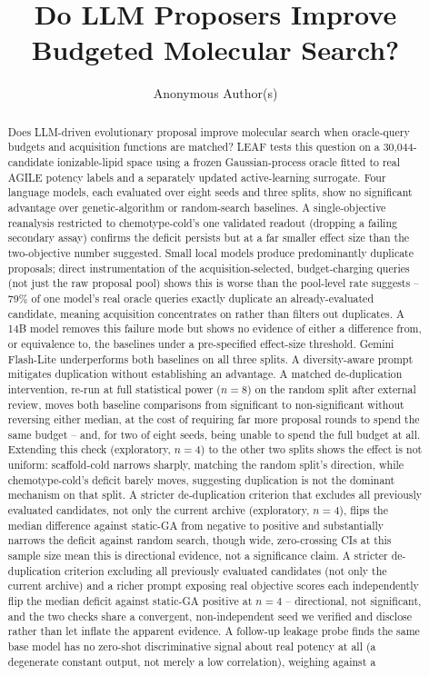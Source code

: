 \documentclass{article}
\title{Do LLM Proposers Improve Budgeted Molecular Search?}
\author{Anonymous Author(s)}
\date{}
\begin{document}
\maketitle

\begin{abstract}
Does LLM-driven evolutionary proposal improve molecular search when oracle-query budgets and acquisition functions are matched? LEAF tests this question on a 30,044-candidate ionizable-lipid space using a frozen Gaussian-process oracle fitted to real AGILE potency labels and a separately updated active-learning surrogate. Four language models, each evaluated over eight seeds and three splits, show no significant advantage over genetic-algorithm or random-search baselines. A single-objective reanalysis restricted to chemotype-cold's one validated readout (dropping a failing secondary assay) confirms the deficit persists but at a far smaller effect size than the two-objective number suggested. Small local models produce predominantly duplicate proposals; direct instrumentation of the acquisition-selected, budget-charging queries (not just the raw proposal pool) shows this is worse than the pool-level rate suggests -- 79\% of one model's real oracle queries exactly duplicate an already-evaluated candidate, meaning acquisition concentrates on rather than filters out duplicates. A 14B model removes this failure mode but shows no evidence of either a difference from, or equivalence to, the baselines under a pre-specified effect-size threshold. Gemini Flash-Lite underperforms both baselines on all three splits. A diversity-aware prompt mitigates duplication without establishing an advantage. A matched de-duplication intervention, re-run at full statistical power ($n=8$) on the random split after external review, moves both baseline comparisons from significant to non-significant without reversing either median, at the cost of requiring far more proposal rounds to spend the same budget -- and, for two of eight seeds, being unable to spend the full budget at all. Extending this check (exploratory, $n=4$) to the other two splits shows the effect is not uniform: scaffold-cold narrows sharply, matching the random split's direction, while chemotype-cold's deficit barely moves, suggesting duplication is not the dominant mechanism on that split. A stricter de-duplication criterion that excludes all previously evaluated candidates, not only the current archive (exploratory, $n=4$), flips the median difference against static-GA from negative to positive and substantially narrows the deficit against random search, though wide, zero-crossing CIs at this sample size mean this is directional evidence, not a significance claim. A stricter de-duplication criterion excluding all previously evaluated candidates (not only the current archive) and a richer prompt exposing real objective scores each independently flip the median deficit against static-GA positive at $n=4$ -- directional, not significant, and the two checks share a convergent, non-independent seed we verified and disclose rather than let inflate the apparent evidence. A follow-up leakage probe finds the same base model has no zero-shot discriminative signal about real potency at all (a degenerate constant output, not merely a low correlation), weighing against a 
\end{abstract}
\end{document}
